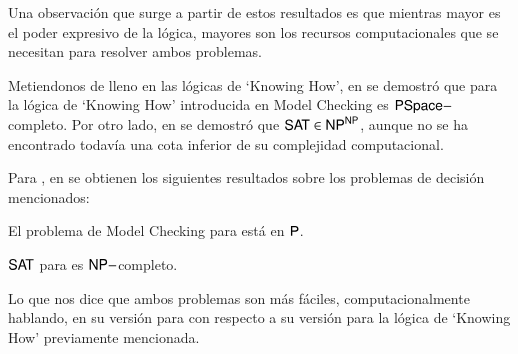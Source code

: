 Una observación que surge a partir de estos resultados es que mientras mayor es el poder expresivo de la lógica, mayores son los recursos 
computacionales que se necesitan para resolver ambos problemas.

Metiendonos de lleno en las lógicas de `Knowing How', en \cite{Demri_Fervari_2023} se demostró que para la lógica de `Knowing How' introducida 
en \cite{Wang15KH,Wang2018GoalDirectedKH} Model Checking es ${\rm\textsf{PSpace}}-$completo. Por otro lado, en \cite{SAT_Upper_Bound} se demostró que 
$\rm\textsf{SAT} \in \rm\textsf{NP}^{\rm\textsf{NP}}$, aunque no se ha encontrado todavía una cota inferior de su complejidad computacional.

Para \KHilogic, en \cite{ArecesFSV25,SaraviaPHD} se obtienen los siguientes resultados sobre los problemas de decisión mencionados:
\begin{teorema}
    El problema de Model Checking para \KHilogic está en $\rm\textsf{P}$.
\end{teorema}

\begin{teorema}
    $\rm\textsf{SAT}$ para \KHilogic es $\rm\textsf{NP}-$completo.
\end{teorema}

Lo que nos dice que ambos problemas son más fáciles, computacionalmente hablando, en su versión para \KHilogic con respecto a su versión para 
la lógica de `Knowing How' previamente mencionada.